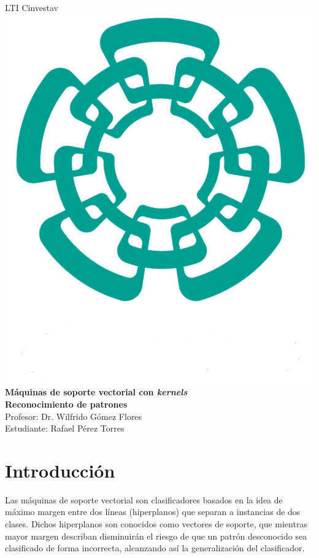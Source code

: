 \documentclass[spanish,12pt]{article}
\date{}
\begin{document}
\begin{center}
\huge{LTI Cinvestav}\\[16pt]
\includegraphics[scale=0.08]{imagenes/cinvestav2.jpg}\\[1pt]
\large{\textbf{Máquinas de soporte vectorial con \emph{kernels}}}\\[16pt]
\textbf{Reconocimiento de patrones}\\[6pt]
Profesor: Dr. Wilfrido Gómez Flores \\[16pt]
Estudiante: Rafael Pérez Torres\\[16pt]
\par\end{center}


\section{Introducción}

Las máquinas de soporte vectorial son clasificadores basados en la
idea de máximo margen entre dos líneas (hiperplanos) que separan a
instancias de dos clases. Dichos hiperplanos son conocidos como vectores
de soporte, que mientras mayor margen describan disminuirán el riesgo
de que un patrón desconocido sea clasificado de forma incorrecta,
alcanzando así la generalización del clasificador.
\end{document}
